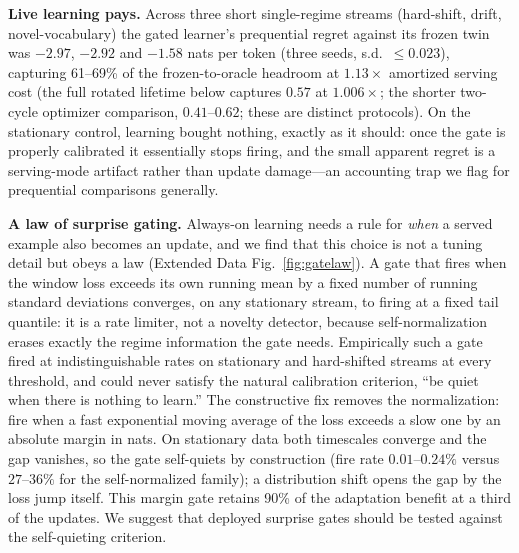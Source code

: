 \documentclass[11pt]{article}
\newcommand{\heading}[1]{\vspace{4pt}\noindent\textbf{#1}\hspace{0.6em}}
\begin{document}
\heading{Live learning pays.}
Across three short single-regime streams (hard-shift, drift, novel-vocabulary)
the gated learner's prequential regret against its frozen twin was $-2.97$,
$-2.92$ and $-1.58$ nats per token (three seeds, s.d.\ $\le0.023$), capturing
61--69\% of the frozen-to-oracle headroom at $1.13\times$ amortized serving cost
(the full rotated lifetime below captures $0.57$ at $1.006\times$; the shorter
two-cycle optimizer comparison, $0.41$--$0.62$; these are distinct protocols). On the
stationary control, learning bought nothing, exactly as it should: once the gate
is properly calibrated it essentially stops firing, and the small apparent
regret is a serving-mode artifact rather than update damage---an accounting trap
we flag for prequential comparisons generally.

\heading{A law of surprise gating.}
Always-on learning needs a rule for \emph{when} a served example also becomes an
update, and we find that this choice is not a tuning detail but obeys a law
(Extended Data Fig.~\ref{fig:gatelaw}). A gate that fires when the window loss
exceeds its own running mean by a fixed number of running standard deviations
converges, on any stationary stream, to firing at a fixed tail quantile: it is a
rate limiter, not a novelty detector, because self-normalization erases exactly
the regime information the gate needs. Empirically such a gate fired at
indistinguishable rates on stationary and hard-shifted streams at every
threshold, and could never satisfy the natural calibration criterion, ``be quiet
when there is nothing to learn.'' The constructive fix removes the
normalization: fire when a fast exponential moving average of the loss exceeds a
slow one by an absolute margin in nats. On stationary data both timescales
converge and the gap vanishes, so the gate self-quiets by construction (fire
rate $0.01$--$0.24\%$ versus $27$--$36\%$ for the self-normalized family); a
distribution shift opens the gap by the loss jump itself. This margin gate
retains 90\% of the adaptation benefit at a third of the updates. We suggest
that deployed surprise gates should be tested against the self-quieting
criterion.
\end{document}
